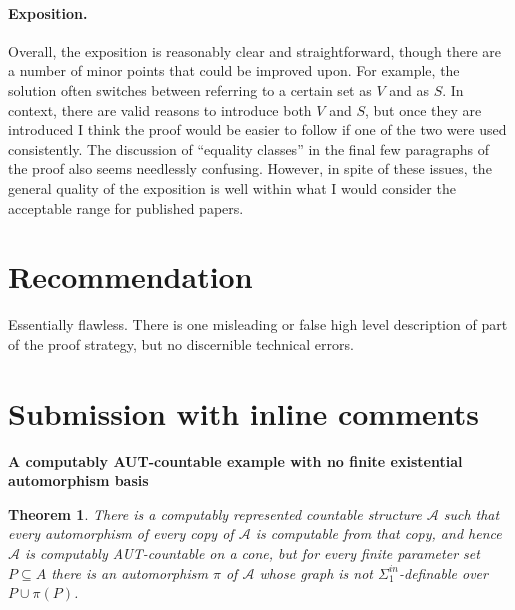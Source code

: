 \documentclass[12pt]{article}
\newtheorem{theorem}{Theorem}
\begin{document}
\paragraph{Exposition.}

Overall, the exposition is reasonably clear and straightforward, though there are a number of minor points that could be improved upon. For example, the solution often switches between referring to a certain set as $V$ and as $S$. In context, there are valid reasons to introduce both $V$ and $S$, but once they are introduced I think the proof would be easier to follow if one of the two were used consistently. The discussion of ``equality classes'' in the final few paragraphs of the proof also seems needlessly confusing. However, in spite of these issues, the general quality of the exposition is well within what I would consider the acceptable range for published papers.

\section{Recommendation}
Essentially flawless. There is one misleading or false high level description of part of the proof strategy, but no discernible technical errors.


  \section{Submission with inline comments}

%
\date{}


\begin{center}
{\bf A computably AUT-countable example with no finite existential
automorphism basis}
\end{center}

\begin{theorem}
There is a computably represented countable structure $\mathcal A$ such
that every automorphism of every copy of $\mathcal A$ is computable from
that copy, and hence $\mathcal A$ is computably AUT-countable on a cone,
but for every finite parameter set $P\subseteq A$ there is an
automorphism $\pi$ of $\mathcal A$ whose graph is not
$\Sigma^{in}_1$-definable over $P\cup\pi(P)$.
\end{theorem}
\end{document}

